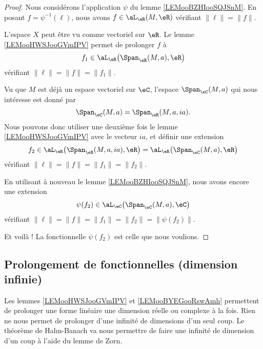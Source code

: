 \begin{proof}
	Nous considérons l'application \( \psi\) du lemme \ref{LEMooBZHIooSQJSnM}. En posant \( f=\psi^{-1}(\ell)\), nous avons $f\in\aL_{\eR}(M,\eR)$ vérifiant \( \| \ell \|=\| f \|\).

	L'espace \( X\) peut être vu comme vectoriel sur \( \eR\). Le lemme \ref{LEMooHWSJooGVmIPV} permet de prolonger \( f\) à
	\begin{equation}
		f_1\in\aL_{\eR}\big( \Span_{\eR}(M,a),\eR \big)
	\end{equation}
	vérifiant \( \| \ell \|=\| f \|=\| f_1 \|\).

	Vu que \( M\) est déjà un espace vectoriel sur \( \eC\), l'espace \( \Span_{\eC}(M,a)\) qui nous intéresse est donné par
	\begin{equation}
		\Span_{\eC}(M,a)=\Span_{\eR}(M,a,ia).
	\end{equation}
	Nous pouvons donc utiliser une deuxième fois le lemme \ref{LEMooHWSJooGVmIPV} avec le vecteur \( ia\), et définir une extension
	\begin{equation}
		f_2\in\aL_{\eR}\big( \Span_{\eR}(M,a,ia),\eR \big)=\aL_{\eR}\big( \Span_{\eC}(M,a),\eR \big)
	\end{equation}
	vérifiant \( \| \ell \|=\| f \|=\| f_1 \|=\| f_2 \|\).

	En utilisant à nouveau le lemme \ref{LEMooBZHIooSQJSnM}, nous avons encore une extension
	\begin{equation}
		\psi(f_2)\in\aL_{\eC}\big( \Span_{\eC}(M,a),\eC \big)
	\end{equation}
	vérifiant \( \| \ell \|=\| f \|=\| f_1 \|=\| f_2 \|=\| \psi(f_2) \|\).

	Et voilà ! La fonctionnelle \( \psi(f_2)\) est celle que nous voulions.
\end{proof}

\subsection{Prolongement de fonctionnelles (dimension infinie)}

Les lemmes \ref{LEMooHWSJooGVmIPV} et \ref{LEMooBYEGooRswAmh} permettent de prolonger une forme linéaire une dimension réelle ou complexe à la fois. Rien ne nous permet de prolonger d'une infinité de dimensions d'un seul coup. Le théorème de Hahn-Banach va nous permettre de faire une infinité de dimension d'un coup à l'aide du lemme de Zorn.

